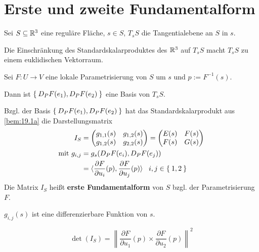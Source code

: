 \section{Erste und zweite Fundamentalform}%
Sei $S \subseteq \mathbb{R}^3$ eine reguläre Fläche, $s \in S$, $T_s S$ die Tangentialebene
an $S$ in $s$.

\begin{bemerkung}%
    \begin{bemenum}
        \item \label{bem:19.1a} Die Einschränkung des Standardskalarproduktes des $\mathbb{R}^3$ auf
              $T_s S$ macht $T_s S$ zu einem euklidischen Vektorraum.
        \item Sei $F: U \rightarrow V$ eine lokale Parametrisierung von $S$ um
              $s$ und $p := F^{-1}(s)$.

              Dann ist $\Set{D_P F(e_1), D_P F(e_2)}$ eine Basis von $T_s S$.
        \item Bzgl. der Basis $\Set{D_P F(e_1), D_P F(e_2)}$ hat das 
              Standardskalarprodukt aus \cref{bem:19.1a} die Darstellungsmatrix
              \begin{align*}
                I_S &= \begin{pmatrix}
                          g_{1,1}(s) & g_{1,2}(s)\\
                          g_{1,2}(s) & g_{2,2}(s)
                       \end{pmatrix} =
                       \begin{pmatrix}
                          E(s) & F(s) \\
                          F(s) & G(s)
                       \end{pmatrix}\\
       \text{mit } g_{i,j} &= g_s(D_P F(e_i), D_P F(e_j))\\
                      &= \langle \frac{\partial F}{\partial u_i} (p), \frac{\partial F}{\partial u_j} (p) \rangle \;\;\; i,j \in \Set{1,2}
              \end{align*}
              Die Matrix $I_S$ heißt \textbf{erste Fundamentalform}
              von $S$ bzgl. der Parametrisierung $F$.
        \item $g_{i,j}(s)$ ist eine differenzierbare Funktion von $s$.
    \end{bemenum}
\end{bemerkung}

\begin{bemerkung}
    \[\det(I_S) = \left \| \frac{\partial F}{\partial u_1}(p) \times \frac{\partial F}{\partial u_2}(p) \right \|^2\] 
\end{bemerkung}

